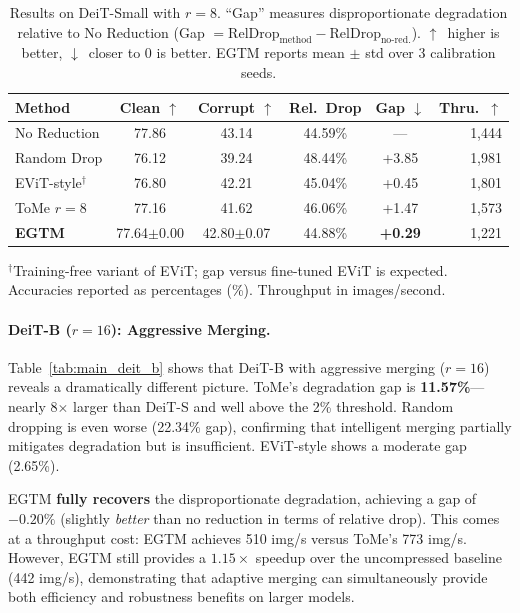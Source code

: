 \documentclass{article}
\newcommand{\ours}{EGTM}
\begin{document}
\begin{table}[t]
\caption{Results on DeiT-Small with $r{=}8$. ``Gap'' measures disproportionate degradation relative to No Reduction (Gap $= \text{RelDrop}_{\text{method}} - \text{RelDrop}_{\text{no-red.}}$). $\uparrow$~higher is better, $\downarrow$~closer to 0 is better. \ours{} reports mean $\pm$ std over 3 calibration seeds.}
\label{tab:main_deit_s}
\centering
\small
\begin{tabular}{lccccr}
\toprule
Method & Clean $\uparrow$ & Corrupt $\uparrow$ & Rel.\ Drop & Gap $\downarrow$ & Thru.\ $\uparrow$ \\
\midrule
No Reduction    & 77.86 & 43.14 & 44.59\% & ---   & 1,444 \\
Random Drop     & 76.12 & 39.24 & 48.44\% & +3.85 & 1,981 \\
EViT-style$^\dag$      & 76.80 & 42.21 & 45.04\% & +0.45 & 1,801 \\
ToMe $r{=}8$   & 77.16 & 41.62 & 46.06\% & +1.47 & 1,573 \\
\textbf{\ours{}} & 77.64{\scriptsize$\pm$0.00} & 42.80{\scriptsize$\pm$0.07} & 44.88\% & \textbf{+0.29} & 1,221 \\
\bottomrule
\end{tabular}
\vspace{-2mm}
\begin{flushleft}
{\footnotesize $^\dag$Training-free variant of EViT; gap versus fine-tuned EViT is expected.\\
Accuracies reported as percentages (\%). Throughput in images/second.}
\end{flushleft}
\end{table}

\paragraph{DeiT-B ($r{=}16$): Aggressive Merging.}
Table~\ref{tab:main_deit_b} shows that DeiT-B with aggressive merging ($r{=}16$) reveals a dramatically different picture. ToMe's degradation gap is \textbf{11.57\%}---nearly 8$\times$ larger than DeiT-S and well above the 2\% threshold. Random dropping is even worse (22.34\% gap), confirming that intelligent merging partially mitigates degradation but is insufficient. EViT-style shows a moderate gap (2.65\%).

\ours{} \textbf{fully recovers} the disproportionate degradation, achieving a gap of $-0.20\%$ (slightly \emph{better} than no reduction in terms of relative drop). This comes at a throughput cost: \ours{} achieves 510 img/s versus ToMe's 773 img/s. However, \ours{} still provides a $1.15\times$ speedup over the uncompressed baseline (442 img/s), demonstrating that adaptive merging can simultaneously provide both efficiency and robustness benefits on larger models.
\end{document}

